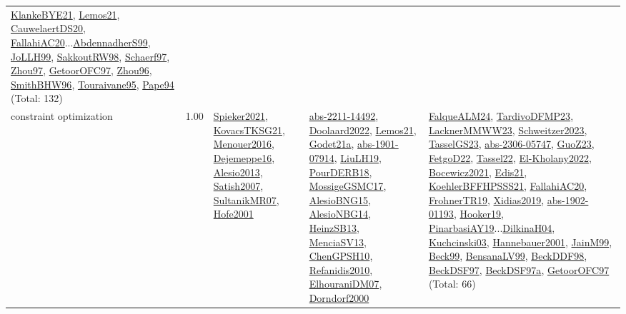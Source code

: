 {\begin{longtable}{p{3cm}r>{\raggedright\arraybackslash}p{6cm}>{\raggedright\arraybackslash}p{6cm}>{\raggedright\arraybackslash}p{8cm}}
\hyperref[detail:KlankeBYE21]{KlankeBYE21}, \hyperref[detail:Lemos21]{Lemos21}, \hyperref[detail:CauwelaertDS20]{CauwelaertDS20}, \hyperref[detail:FallahiAC20]{FallahiAC20}...\hyperref[detail:AbdennadherS99]{AbdennadherS99}, \hyperref[detail:JoLLH99]{JoLLH99}, \hyperref[detail:SakkoutRW98]{SakkoutRW98}, \hyperref[detail:Schaerf97]{Schaerf97}, \hyperref[detail:Zhou97]{Zhou97}, \hyperref[detail:GetoorOFC97]{GetoorOFC97}, \hyperref[detail:Zhou96]{Zhou96}, \hyperref[detail:SmithBHW96]{SmithBHW96}, \hyperref[detail:Touraivane95]{Touraivane95}, \hyperref[detail:Pape94]{Pape94} (Total: 132)\\
\index{constraint optimization}\index{CP!constraint optimization}constraint optimization &  1.00 & \hyperref[detail:Spieker2021]{Spieker2021}, \hyperref[detail:KovacsTKSG21]{KovacsTKSG21}, \hyperref[detail:Menouer2016]{Menouer2016}, \hyperref[detail:Dejemeppe16]{Dejemeppe16}, \hyperref[detail:Alesio2013]{Alesio2013}, \hyperref[detail:Satish2007]{Satish2007}, \hyperref[detail:SultanikMR07]{SultanikMR07}, \hyperref[detail:Hofe2001]{Hofe2001} & \hyperref[detail:abs-2211-14492]{abs-2211-14492}, \hyperref[detail:Doolaard2022]{Doolaard2022}, \hyperref[detail:Lemos21]{Lemos21}, \hyperref[detail:Godet21a]{Godet21a}, \hyperref[detail:abs-1901-07914]{abs-1901-07914}, \hyperref[detail:LiuLH19]{LiuLH19}, \hyperref[detail:PourDERB18]{PourDERB18}, \hyperref[detail:MossigeGSMC17]{MossigeGSMC17}, \hyperref[detail:AlesioBNG15]{AlesioBNG15}, \hyperref[detail:AlesioNBG14]{AlesioNBG14}, \hyperref[detail:HeinzSB13]{HeinzSB13}, \hyperref[detail:MenciaSV13]{MenciaSV13}, \hyperref[detail:ChenGPSH10]{ChenGPSH10}, \hyperref[detail:Refanidis2010]{Refanidis2010}, \hyperref[detail:ElhouraniDM07]{ElhouraniDM07}, \hyperref[detail:Dorndorf2000]{Dorndorf2000} & \hyperref[detail:FalqueALM24]{FalqueALM24}, \hyperref[detail:TardivoDFMP23]{TardivoDFMP23}, \hyperref[detail:LacknerMMWW23]{LacknerMMWW23}, \hyperref[detail:Schweitzer2023]{Schweitzer2023}, \hyperref[detail:TasselGS23]{TasselGS23}, \hyperref[detail:abs-2306-05747]{abs-2306-05747}, \hyperref[detail:GuoZ23]{GuoZ23}, \hyperref[detail:FetgoD22]{FetgoD22}, \hyperref[detail:Tassel22]{Tassel22}, \hyperref[detail:El-Kholany2022]{El-Kholany2022}, \hyperref[detail:Bocewicz2021]{Bocewicz2021}, \hyperref[detail:Edis21]{Edis21}, \hyperref[detail:KoehlerBFFHPSSS21]{KoehlerBFFHPSSS21}, \hyperref[detail:FallahiAC20]{FallahiAC20}, \hyperref[detail:FrohnerTR19]{FrohnerTR19}, \hyperref[detail:Xidias2019]{Xidias2019}, \hyperref[detail:abs-1902-01193]{abs-1902-01193}, \hyperref[detail:Hooker19]{Hooker19}, \hyperref[detail:PinarbasiAY19]{PinarbasiAY19}...\hyperref[detail:DilkinaH04]{DilkinaH04}, \hyperref[detail:Kuchcinski03]{Kuchcinski03}, \hyperref[detail:Hannebauer2001]{Hannebauer2001}, \hyperref[detail:JainM99]{JainM99}, \hyperref[detail:Beck99]{Beck99}, \hyperref[detail:BensanaLV99]{BensanaLV99}, \hyperref[detail:BeckDDF98]{BeckDDF98}, \hyperref[detail:BeckDSF97]{BeckDSF97}, \hyperref[detail:BeckDSF97a]{BeckDSF97a}, \hyperref[detail:GetoorOFC97]{GetoorOFC97} (Total: 66)\\

\end{longtable}}
